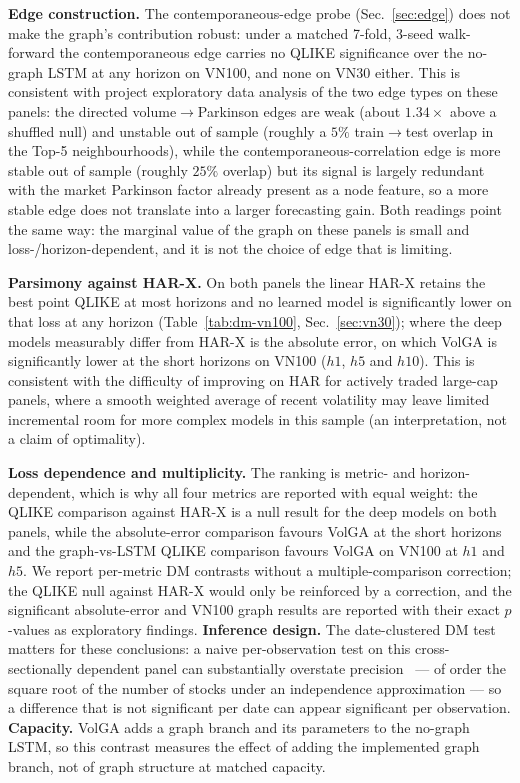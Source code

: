 \documentclass[runningheads]{llncs}
\begin{document}
\textbf{Edge construction.} The contemporaneous-edge probe (Sec.~\ref{sec:edge}) does not make the
graph's contribution robust: under a matched 7-fold, 3-seed walk-forward the contemporaneous edge
carries no QLIKE significance over the no-graph LSTM at any horizon on VN100, and none on VN30 either.
This is consistent with project exploratory data analysis of the two edge types on
these panels: the directed volume$\to$Parkinson edges are weak (about $1.34\times$ above a shuffled
null) and unstable out of sample (roughly a $5\%$ train$\to$test overlap in the Top-5 neighbourhoods),
while the contemporaneous-correlation edge is more stable out of sample (roughly $25\%$ overlap) but
its signal is largely redundant with the market Parkinson factor already present as a node feature, so
a more stable edge does not translate into a larger forecasting gain. Both readings point the same
way: the marginal value of the graph on these panels is small and loss-/horizon-dependent, and it is
not the choice of edge that is limiting.

\textbf{Parsimony against HAR-X.} On both panels the linear HAR-X retains the best point QLIKE at most
horizons and no learned model is significantly lower on that loss at any horizon
(Table~\ref{tab:dm-vn100}, Sec.~\ref{sec:vn30}); where the deep models measurably differ from HAR-X is
the absolute error, on which VolGA is significantly lower at the short horizons on VN100 ($h1$, $h5$
and $h10$). This is consistent with the difficulty of improving on HAR for actively traded large-cap
panels, where a smooth weighted average of recent volatility may leave limited incremental room for
more complex models in this sample (an interpretation, not a claim of optimality).

\textbf{Loss dependence and multiplicity.} The ranking is metric- and horizon-dependent, which is why
all four metrics are reported with equal weight: the QLIKE comparison against HAR-X is a null result
for the deep models on both panels, while the absolute-error comparison favours VolGA at the short
horizons and the graph-vs-LSTM QLIKE comparison favours VolGA on VN100 at $h1$ and $h5$. We report
per-metric DM contrasts without a multiple-comparison correction; the QLIKE null against HAR-X would
only be reinforced by a correction, and the significant absolute-error and VN100 graph results are
reported with their exact $p$-values as exploratory findings. \textbf{Inference design.} The
date-clustered DM test matters for these conclusions: a naive per-observation test on this
cross-sectionally dependent panel can substantially overstate precision~\cite{petersen2009} --- of
order the square root of the number of stocks under an independence approximation --- so a difference
that is not significant per date can appear significant per observation.
\textbf{Capacity.} VolGA adds a graph branch and its parameters to the no-graph LSTM, so this contrast
measures the effect of adding the implemented graph branch, not of graph structure at matched capacity.
\end{document}
